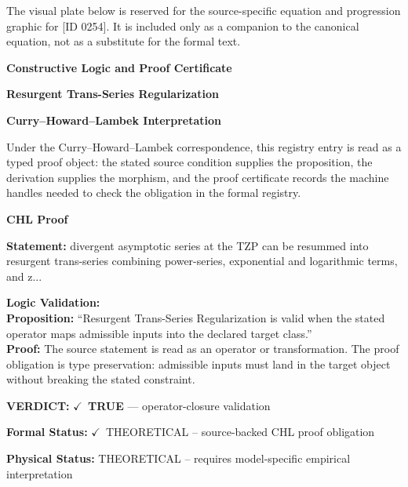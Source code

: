 \begingroup\footnotesize\sloppy
The visual plate below is reserved for the source-specific equation and progression graphic for [ID 0254]. It is included only as a companion to the canonical equation, not as a substitute for the formal text.
\par\endgroup
\ifTZPDarkEdition
{}
\fi

\clearpage
\begingroup\tzpsupportsetup
\noindent\textbf{\fontsize{10.8pt}{12.8pt}\selectfont [ID 0254] Constructive Logic and Proof Certificate}\par
\noindent\textbf{\fontsize{10pt}{12pt}\selectfont Resurgent Trans-Series Regularization}\par
\vspace{0.45em}
\begingroup
\footnotesize
\setlength{\parskip}{0.22em}
\setlength{\parindent}{0pt}
\noindent\textbf{Curry--Howard--Lambek Interpretation}\par
Under the Curry--Howard--Lambek correspondence, this registry entry is read as a typed proof
object: the stated source condition supplies the proposition, the derivation supplies the
morphism, and the proof certificate records the machine handles needed to check the obligation
in the formal registry.

\vspace{0.45em}
\noindent\textbf{CHL Proof}\par
\textbf{Statement:} divergent asymptotic series at the TZP can be resummed into resurgent trans-series
combining power-series, exponential and logarithmic terms, and z...

\textbf{Logic Validation:}\\
\textbf{Proposition:} ``Resurgent Trans-Series Regularization is valid when the stated operator maps admissible
inputs into the declared target class.''\\
\textbf{Proof:} The source statement is read as an operator or transformation. The proof obligation is
type preservation: admissible inputs must land in the target object without breaking the
stated constraint.

\textbf{VERDICT:} \ensuremath{\checkmark}\ \textbf{TRUE} --- operator-closure validation

\textbf{Formal Status:} \ensuremath{\checkmark}\ THEORETICAL -- source-backed CHL proof obligation

\textbf{Physical Status:} THEORETICAL -- requires model-specific empirical interpretation
\par\vspace{0.45em}
\par
\ifTZPDarkEdition
{}
\fi
\endgroup
\endgroup
